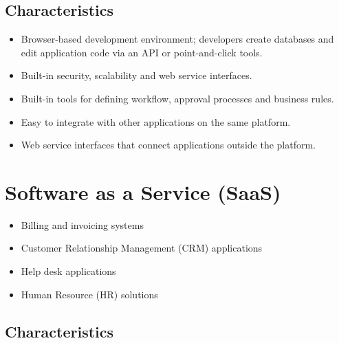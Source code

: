 \documentclass[11pt,a4paper]{article}
\begin{document}

\subsection{Characteristics}

\begin{itemize}\itemsep2pt
  \item Browser-based development environment; developers create databases and edit
        application code via an API or point-and-click tools.
  \item Built-in security, scalability and web service interfaces.
  \item Built-in tools for defining workflow, approval processes and business rules.
  \item Easy to integrate with other applications on the same platform.
  \item Web service interfaces that connect applications outside the platform.
\end{itemize}

\section{Software as a Service (SaaS)}



\begin{itemize}\itemsep2pt
  \item Billing and invoicing systems
  \item Customer Relationship Management (CRM) applications
  \item Help desk applications
  \item Human Resource (HR) solutions
\end{itemize}


\subsection{Characteristics}
\end{document}
